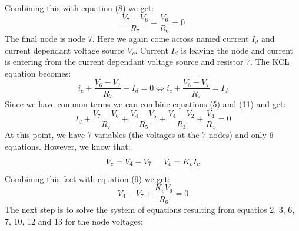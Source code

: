 Combining this with equation (8) we get:
\begin{equation}
    \frac{V_{7}-V_{6}}{R_{7}}-\frac{V_{6}}{R_{6}}=0 
\end{equation}
    The final node is node 7. Here we again come across named current $I_{d}$ and current dependant voltage source $V_{c}$. Current $I_{d}$ is leaving the node and current is entering from the current dependant voltage source and resistor 7. The KCL equation becomes:
    \begin{equation}
     i_{c}+ \frac{V_{6}-V_{7}}{R_{7}}-I_{d}=0 \Leftrightarrow
     i_c+ \frac{V_{6}-V_{7}}{R_{7}}=I_{d}
    \end{equation}
    Since we have common terms we can combine equations (5) and (11) and get:
    \begin{equation}
I_{d}+\frac{V_{7}-V_{6}}{R_{7}}+\frac{V_{4}-V_{5}}{R_{5}}+\frac{V_{4}-V_{2}}{R_{3}}+\frac{V_{4}}{R_{4}}=0 
    \end{equation}
    At this point, we have 7 variables (the voltages at the 7 nodes) and only 6 equations. However, we know that:
    \[ V_c= V_4-V_7 \hspace{5mm} V_c=K_c I_c\]
    Combining this fact with equation (9) we get:
    \begin{equation}
        V_4 -V_7+\frac{K_c V_6}{R_6}=0
    \end{equation}
The next step is to solve the system of equations resulting from equatios 2, 3, 6, 7, 10, 12 and 13 for the node voltages:

